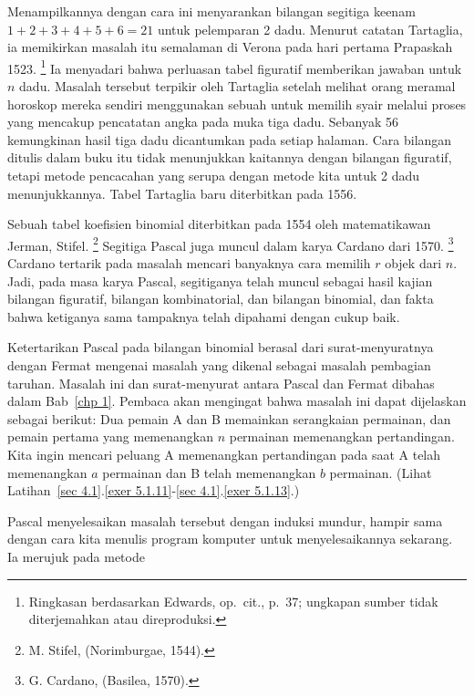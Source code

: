 Menampilkannya dengan cara ini menyarankan bilangan segitiga keenam
$1 + 2 + 3 + 4 + 5 + 6 =
21$ untuk pelemparan 2 dadu.  Menurut catatan Tartaglia, ia memikirkan masalah itu
semalaman di Verona pada hari pertama Prapaskah 1523.
\footnote{Ringkasan berdasarkan Edwards, op.\ cit., p.~37; ungkapan sumber tidak
diterjemahkan atau direproduksi.} Ia menyadari bahwa perluasan tabel
figuratif memberikan jawaban untuk $n$ dadu.  Masalah tersebut terpikir oleh Tartaglia
setelah melihat orang meramal horoskop mereka sendiri menggunakan sebuah  untuk memilih syair melalui proses yang mencakup pencatatan angka pada muka
tiga dadu.  Sebanyak 56 kemungkinan hasil tiga dadu dicantumkan pada setiap halaman.
Cara bilangan ditulis dalam buku itu tidak menunjukkan kaitannya dengan bilangan
figuratif, tetapi metode pencacahan yang serupa dengan metode kita untuk 2 dadu
menunjukkannya.  Tabel Tartaglia baru diterbitkan pada 1556.
\par
Sebuah tabel koefisien binomial diterbitkan pada 1554 oleh matematikawan Jerman, Stifel.
\footnote{M. Stifel,  (Norimburgae, 1544).}
Segitiga Pascal juga muncul dalam  karya Cardano dari 1570.
\footnote{G. Cardano, 
(Basilea, 1570).}  Cardano tertarik pada masalah mencari banyaknya cara memilih $r$
objek dari $n$.  Jadi, pada masa karya Pascal, segitiganya telah muncul sebagai hasil
kajian bilangan figuratif, bilangan kombinatorial, dan bilangan binomial, dan fakta bahwa
ketiganya sama tampaknya telah dipahami dengan cukup baik.
\par
Ketertarikan Pascal pada bilangan binomial
berasal dari surat-menyuratnya dengan Fermat mengenai masalah yang dikenal sebagai
masalah pembagian taruhan.  Masalah ini dan
surat-menyurat antara Pascal dan Fermat dibahas dalam Bab~\ref{chp 1}.  Pembaca akan
mengingat bahwa masalah ini dapat dijelaskan sebagai berikut: Dua pemain A dan B
memainkan serangkaian permainan, dan pemain pertama yang memenangkan $n$ permainan
memenangkan pertandingan.  Kita ingin mencari peluang A memenangkan pertandingan pada
saat A telah memenangkan $a$ permainan dan B telah memenangkan $b$ permainan.  (Lihat
Latihan~\ref{sec 4.1}.\ref{exer 5.1.11}-\ref{sec
4.1}.\ref{exer 5.1.13}.)
\par
Pascal menyelesaikan masalah tersebut dengan induksi mundur, hampir sama dengan cara
kita menulis program komputer untuk menyelesaikannya sekarang.  Ia merujuk pada metode
